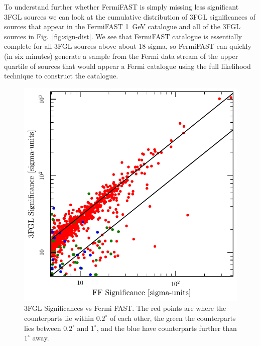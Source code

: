 \documentclass[useAMS,usenatbib]{mn2e}
\begin{document}
To understand further whether FermiFAST is simply missing less
significant 3FGL sources we can look at the cumulative distribution of
3FGL significances of sources that appear in the FermiFAST 1~GeV
catalogue and all of the 3FGL sources in Fig.~\ref{fig:sign-dist}.  We
see that FermiFAST catalogue is essentially complete for all 3FGL
sources above about 18-sigma, so FermiFAST can quickly (in six minutes)
generate a sample from the Fermi data stream of the upper quartile of
sources that would appear a Fermi catalogue using the full likelihood
technique to construct the catalogue.
\begin{figure}
\includegraphics[width=\columnwidth]{sign-comp}
\caption{3FGL Significances vs Fermi FAST.  The red points are
  where the counterparts lie within $0.2^\circ$ of each other, the
  green the counterparts lies between $0.2^\circ$ and $1^\circ$, and
  the blue have counterparts further than $1^\circ$ away. }
\label{fig:fermi_comp}
\end{figure}
\end{document}
